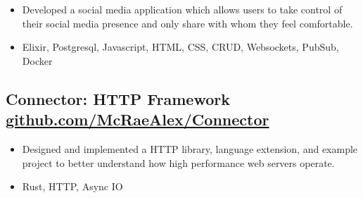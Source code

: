\documentclass{article}
\begin{document}
\begin{itemize}
    \item Developed a social media application which allows users to take control of their social media presence and only share with whom they feel comfortable.
    \item Elixir, Postgresql, Javascript, HTML, CSS, CRUD, Websockets, PubSub, Docker
\end{itemize}

\subsection{Connector: HTTP Framework \href{https://github.com/McRaeAlex/connector}{github.com/McRaeAlex/Connector}}

\begin{itemize}
    \item Designed and implemented a HTTP library, language extension, and example project to better understand how high performance web servers operate.
    \item Rust, HTTP, Async IO
\end{itemize}
\end{document}
